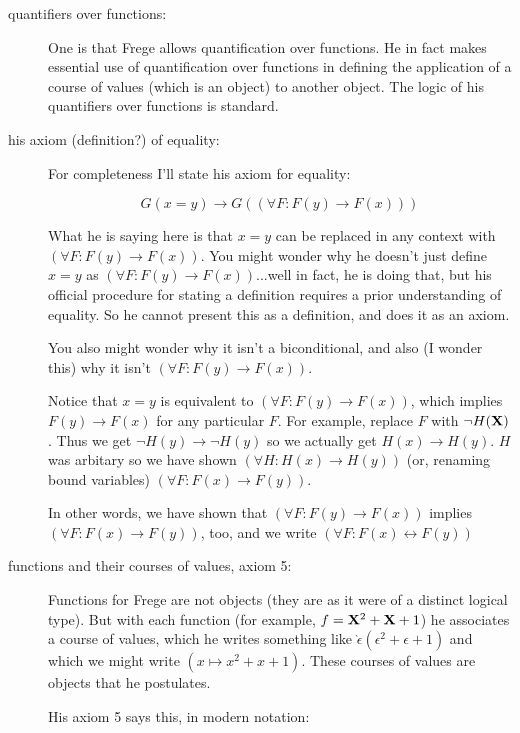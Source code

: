 \documentclass[12pt]{article}
\begin{document}
\begin{description}

\item[quantifiers over functions:]  One is that Frege allows quantification over functions.  He in fact makes essential use of quantification over functions in defining the application of a course of values (which is an object) to another object.  The logic of his quantifiers over functions is standard.

\item[his axiom (definition?) of equality:]  For completeness I'll state his axiom for equality:

$$G(x=y) \rightarrow G((\forall F:F(y) \rightarrow F(x)))$$

What he is saying here is that $x=y$ can be replaced in any context with $(\forall F:F(y) \rightarrow F(x))$.  You might wonder why he doesn't
just define $x=y$ as $(\forall F:F(y) \rightarrow F(x))$...well in fact, he is doing that, but his official procedure for stating a definition requires a prior understanding of equality.  So he cannot present this as a definition, and does it as an axiom.

You also might wonder why it isn't a biconditional, and also (I wonder this) why it isn't $(\forall F:F(y) \rightarrow F(x))$. 

Notice that $x=y$ is equivalent to $(\forall F:F(y) \rightarrow F(x))$, which implies $F(y) \rightarrow F(x)$ for any particular $F$.  For example, replace $F$ with $\neg H({\bf X})$.
Thus we get $\neg H(y) \rightarrow \neg H(y)$ so we actually get $H(x) \rightarrow H(y)$.  $H$ was arbitary so we have shown $(\forall H:H(x) \rightarrow H(y))$ (or, renaming bound variables) $(\forall F:F(x) \rightarrow F(y))$.

In other words, we have shown that  $(\forall F:F(y) \rightarrow F(x))$ implies  $(\forall F:F(x) \rightarrow F(y))$, too, and we  write  $(\forall F:F(x) \leftrightarrow F(y))$

\item[functions and their courses of values, axiom 5:]  Functions for Frege are not objects (they are as it were of a distinct logical type).  But with each function (for example, $f = {\bf X}^2 + {\bf X} + 1$) he associates a course of values, which he writes something like $\grave{\epsilon}(\epsilon^2 + \epsilon +1)$ and which we might write $(x \mapsto x^2+x+1)$.   These courses of values are objects that he postulates.

His axiom 5 says this, in modern notation:


\end{description}
\end{document}
